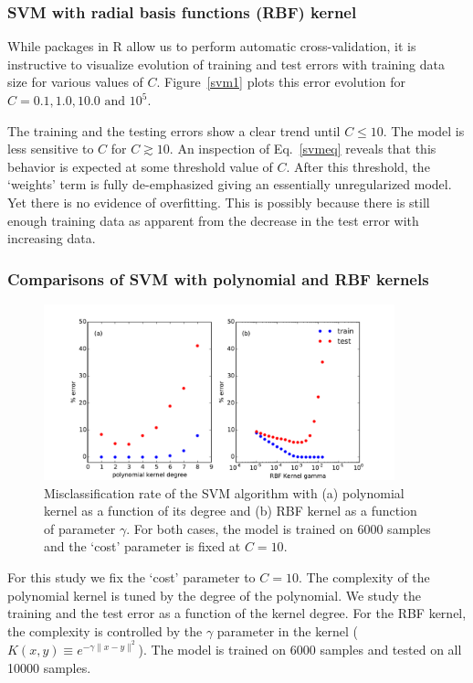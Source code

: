 \documentclass[10pt,letterpaper]{article}
\newcommand{\myeqno}[1]{Eq.~\eqref{#1}}
\begin{document}
\subsubsection{SVM with radial basis functions (RBF) kernel}
While packages in R allow us to perform automatic cross-validation, it is instructive to visualize evolution of training and test errors with training data size for various values of $C$. Figure~\ref{svm1} plots this error evolution for $C = 0.1, 1.0, 10.0 \text{ and } 10^5$. 

The training and the testing errors show a clear trend until $C\leq10$. The model is less sensitive to $C$ for $C\gtrsim10$. An inspection of \myeqno{svmeq} reveals that this behavior is expected at some threshold value of $C$. After this threshold, the `weights' term is fully de-emphasized giving an essentially unregularized model. Yet there is no evidence of overfitting. This is possibly because there is still enough training data as apparent from the decrease in the test error with increasing data. 
\subsubsection{Comparisons of SVM with polynomial and RBF kernels}
\begin{figure}[tbp]
	\begin{center}
	\includegraphics[width=4in]{../results/mnist/svm/error_vs_complexity.pdf}
	\end{center}
	\caption{Misclassification rate of the SVM algorithm with (a) polynomial kernel as a function of its degree and (b) RBF kernel as a function of parameter $\gamma$. For both cases, the model is trained on 6000 samples and the `cost' parameter is fixed at $C=10$. \label{svm2}}
\end{figure}
For this study we fix the `cost' parameter to $C=10$. The complexity of the polynomial kernel is tuned by the degree of the polynomial. We study the training and the test error as a function of the kernel degree. For the RBF kernel, the complexity is controlled by the $\gamma$ parameter in the kernel ($K(x,y) \equiv e^{-\gamma \|x-y\|^2}$). The model is trained on 6000 samples and tested on all 10000 samples. 
\end{document}
